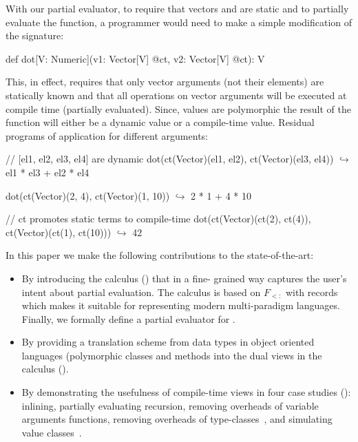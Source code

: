 With our partial evaluator, to require that vectors  and  are
 static and to partially evaluate the function, a programmer would need to make
 a simple modification of the  signature:

\vspace{1.8mm}
\begin{listing}
  def dot[V: Numeric](v1: Vector[V] @ct, v2: Vector[V] @ct): V
\end{listing}
\vspace{1.8mm}

This, in effect, requires that only vector arguments (not their elements) are
 statically known and that all operations on vector arguments will be executed
 at compile time (partially evaluated). Since, values are polymorphic the result
 of the function will either be a dynamic value or a compile-time value. Residual
 programs of  application for different arguments:

\vspace{1.8mm}
\begin{listing}[mathescape]
  // [el1, el2, el3, el4] are dynamic
  dot(ct(Vector)(el1, el2), ct(Vector)(el3, el4))
    $\hookrightarrow$ el1 * el3 + el2 * el4

  dot(ct(Vector)(2, 4), ct(Vector)(1, 10))
    $\hookrightarrow$ 2 * 1 + 4 * 10

  // ct promotes static terms to compile-time
  dot(ct(Vector)(ct(2), ct(4)), ct(Vector)(ct(1), ct(10)))
    $\hookrightarrow$ 42
\end{listing}
\vspace{1.8mm}

In this paper we make the following contributions to the state-of-the-art:
\begin{itemize}

 \item By introducing the \calculus calculus () that in a fine-
 grained way captures the user's intent about partial evaluation. The calculus
 is based on $F_{<:}$ with records which makes it suitable for representing
 modern multi-paradigm languages. Finally, we formally define a partial
 evaluator for \calculus.

 \item By providing a translation scheme from data types in object oriented languages
  (polymorphic classes and methods into the dual views in the \calculus calculus ().

 \item By demonstrating the usefulness of compile-time views in four case
 studies (): inlining, partially evaluating recursion,
  removing overheads of variable arguments functions, removing overheads of
 type-classes~\cite{oliveira2010type}, and simulating value classes~\cite{value-classes}.

\end{itemize}


